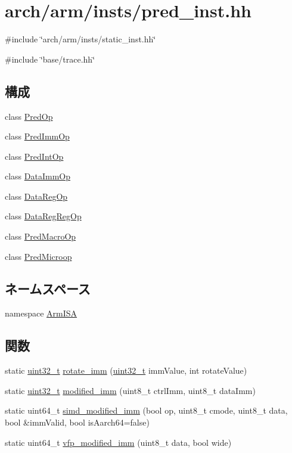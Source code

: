 \hypertarget{pred__inst_8hh}{
\section{arch/arm/insts/pred\_\-inst.hh}
\label{pred__inst_8hh}
}
{\ttfamily \#include \char`\"{}arch/arm/insts/static\_\-inst.hh\char`\"{}}\par
{\ttfamily \#include \char`\"{}base/trace.hh\char`\"{}}\par
\subsection*{構成}
\begin{DoxyCompactItemize}
\item 
class \hyperlink{classArmISA_1_1PredOp}{PredOp}
\item 
class \hyperlink{classArmISA_1_1PredImmOp}{PredImmOp}
\item 
class \hyperlink{classArmISA_1_1PredIntOp}{PredIntOp}
\item 
class \hyperlink{classArmISA_1_1DataImmOp}{DataImmOp}
\item 
class \hyperlink{classArmISA_1_1DataRegOp}{DataRegOp}
\item 
class \hyperlink{classArmISA_1_1DataRegRegOp}{DataRegRegOp}
\item 
class \hyperlink{classArmISA_1_1PredMacroOp}{PredMacroOp}
\item 
class \hyperlink{classArmISA_1_1PredMicroop}{PredMicroop}
\end{DoxyCompactItemize}
\subsection*{ネームスペース}
\begin{DoxyCompactItemize}
\item 
namespace \hyperlink{namespaceArmISA}{ArmISA}
\end{DoxyCompactItemize}
\subsection*{関数}
\begin{DoxyCompactItemize}
\item 
static \hyperlink{Type_8hh_a435d1572bf3f880d55459d9805097f62}{uint32\_\-t} \hyperlink{namespaceArmISA_a9d2ba1e68d5f53a06304723f3c5c6688}{rotate\_\-imm} (\hyperlink{Type_8hh_a435d1572bf3f880d55459d9805097f62}{uint32\_\-t} immValue, int rotateValue)
\item 
static \hyperlink{Type_8hh_a435d1572bf3f880d55459d9805097f62}{uint32\_\-t} \hyperlink{namespaceArmISA_aeff4669771cc7bfaf7953423b8565c04}{modified\_\-imm} (uint8\_\-t ctrlImm, uint8\_\-t dataImm)
\item 
static uint64\_\-t \hyperlink{namespaceArmISA_a09d2d595e35b6cdf8e1819b84460bbad}{simd\_\-modified\_\-imm} (bool op, uint8\_\-t cmode, uint8\_\-t data, bool \&immValid, bool isAarch64=false)
\item 
static uint64\_\-t \hyperlink{namespaceArmISA_a1a3df5ced6cfdc1b70badc3d48949216}{vfp\_\-modified\_\-imm} (uint8\_\-t data, bool wide)
\end{DoxyCompactItemize}
